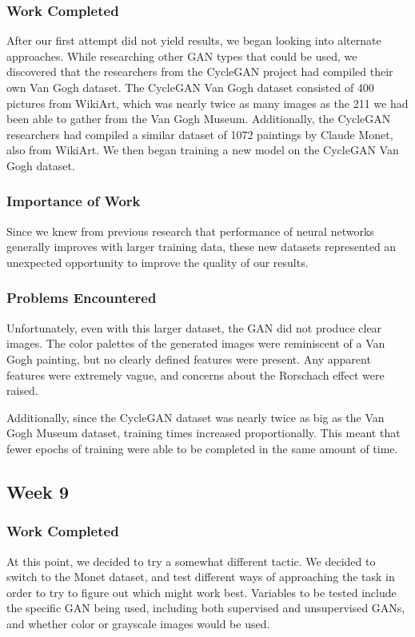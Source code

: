 \documentclass[11pt,letterpaper]{article}
\begin{document}
			\subsubsection{Work Completed}
				After our first attempt did not yield results, we began looking into alternate approaches.
				While researching other GAN types that could be used, we discovered that the researchers from the CycleGAN\cite{CycleGAN2017}\cite{isola2017image} project had compiled their own Van Gogh dataset.
				The CycleGAN Van Gogh dataset consisted of 400 pictures from WikiArt\cite{wikiartVanGogh}, which was nearly twice as many images as the 211 we had been able to gather from the Van Gogh Museum.
				Additionally, the CycleGAN researchers had compiled a similar dataset of 1072 paintings by Claude Monet, also from WikiArt.
				We then began training a new model on the CycleGAN Van Gogh dataset.
			\subsubsection{Importance of Work}
				Since we knew from previous research that performance of neural networks generally improves with larger training data, these new datasets represented an unexpected opportunity to improve the quality of our results.
			\subsubsection{Problems Encountered}
				Unfortunately, even with this larger dataset, the GAN did not produce clear images.
				The color palettes of the generated images were reminiscent of a Van Gogh painting, but no clearly defined features were present.
				Any apparent features were extremely vague, and concerns about the Rorschach effect were raised.

				Additionally, since the CycleGAN dataset was nearly twice as big as the Van Gogh Museum dataset, training times increased proportionally.
				This meant that fewer epochs of training were able to be completed in the same amount of time.

		\subsection{Week 9}
			\subsubsection{Work Completed}
				At this point, we decided to try a somewhat different tactic.
				We decided to switch to the Monet dataset, and test different ways of approaching the task in order to try to figure out which might work best.
				Variables to be tested include the specific GAN being used, including both supervised and unsupervised GANs, and whether color or grayscale images would be used.
\end{document}
